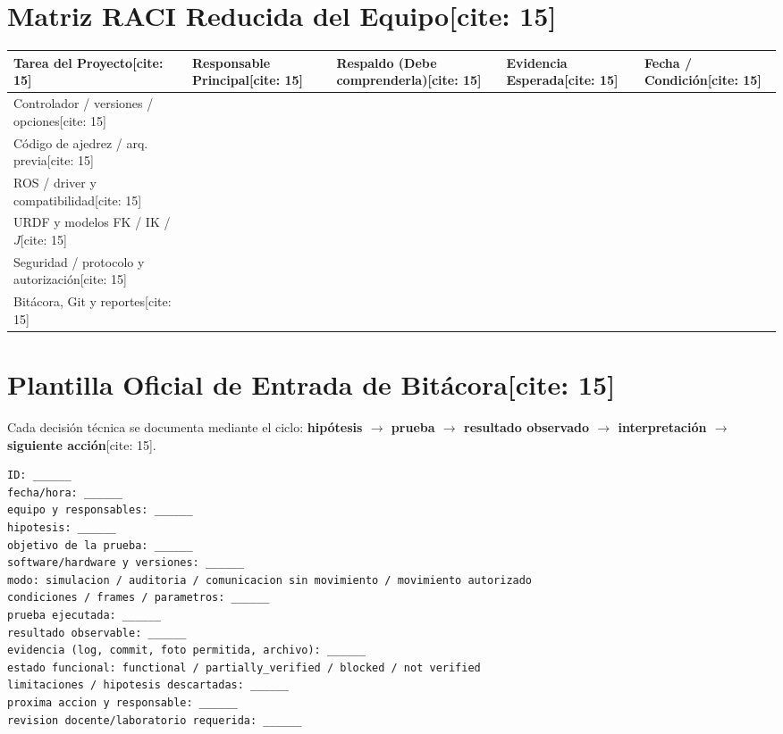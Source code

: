 \documentclass[11pt, a4paper]{article}
\begin{document}
\section{Matriz RACI Reducida del Equipo[cite: 15]}
\begin{center}
\footnotesize
\renewcommand{\arraystretch}{1.4}
\begin{tabularx}{\textwidth}{|>{\hsize=1.2\hsize\raggedright\arraybackslash}X|>{\hsize=0.9\hsize\raggedright\arraybackslash}X|>{\hsize=1.0\hsize\raggedright\arraybackslash}X|>{\hsize=1.0\hsize\raggedright\arraybackslash}X|>{\hsize=0.9\hsize\raggedright\arraybackslash}X|}
\hline
\rowcolor{ucbblue!15}
\textbf{Tarea del Proyecto}[cite: 15] & \textbf{Responsable Principal}[cite: 15] & \textbf{Respaldo} (Debe comprenderla)[cite: 15] & \textbf{Evidencia Esperada}[cite: 15] & \textbf{Fecha / Condición}[cite: 15] \\ \hline
Controlador / versiones / opciones[cite: 15] & & & & \\ \hline
Código de ajedrez / arq. previa[cite: 15] & & & & \\ \hline
ROS / driver y compatibilidad[cite: 15] & & & & \\ \hline
URDF y modelos FK / IK / $J$[cite: 15] & & & & \\ \hline
Seguridad / protocolo y autorización[cite: 15] & & & & \\ \hline
Bitácora, Git y reportes[cite: 15] & & & & \\ \hline
\end{tabularx}
\end{center}

\section{Plantilla Oficial de Entrada de Bitácora[cite: 15]}
Cada decisión técnica se documenta mediante el ciclo: \textbf{hipótesis $\to$ prueba $\to$ resultado observado $\to$ interpretación $\to$ siguiente acción}[cite: 15].

\begin{lstlisting}
ID: ______
fecha/hora: ______
equipo y responsables: ______
hipotesis: ______
objetivo de la prueba: ______
software/hardware y versiones: ______
modo: simulacion / auditoria / comunicacion sin movimiento / movimiento autorizado
condiciones / frames / parametros: ______
prueba ejecutada: ______
resultado observable: ______
evidencia (log, commit, foto permitida, archivo): ______
estado funcional: functional / partially_verified / blocked / not verified
limitaciones / hipotesis descartadas: ______
proxima accion y responsable: ______
revision docente/laboratorio requerida: ______
\end{lstlisting}
\end{document}

